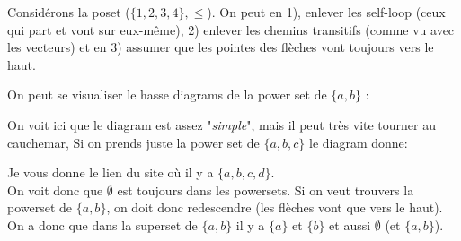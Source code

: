 Considérons la poset ($\{1, 2, 3, 4\}, \leq$). On peut en 1), enlever les self-loop (ceux qui part et vont sur eux-même), 2) enlever les chemins transitifs (comme vu avec les vecteurs) et en 3) assumer que les pointes des flèches vont toujours vers le haut.
\\
\begin{exemple}
On peut se visualiser le hasse diagrams de la power set de $\{a, b\}$ :
\\
\begin{center}
\end{center}
On voit ici que le diagram est assez "\textit{simple}", mais il peut très vite tourner au cauchemar, Si on prends juste la power set de $\{a, b, c\}$ le diagram donne:
\begin{center}
\end{center}
Je vous donne le lien du site où il y a $\{a, b, c, d\}$.
\\
On voit donc que $\emptyset$ est toujours dans les powersets. Si on veut trouvers la powerset de $\{a, b\}$, on doit donc redescendre (les flèches vont que vers le haut). On a donc que dans la superset de $\{a, b\}$ il y a $\{a\}$ et $\{b\}$ et aussi $\emptyset$  (et $\{a, b\}$).

\end{exemple}



